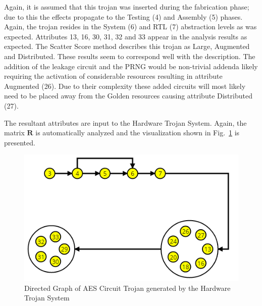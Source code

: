 \documentclass[journal, hidelinks]{IEEEtran}
\begin{document}
Again, it is assumed that this trojan was inserted during the fabrication phase; due to this the effects propagate to the Testing (4) and Assembly (5) phases.
Again, the trojan resides in the System (6) and RTL (7) abstraction levels as was expected.
Attributes 13, 16, 30, 31, 32 and 33 appear in the analysis results as expected.
The Scatter Score method describes this trojan as Large, Augmented and Distributed. 
These results seem to correspond well with the description. 
The addition of the leakage circuit and the PRNG would be non-trivial addenda likely requiring the activation of considerable resources resulting in attribute Augmented (26).
Due to their complexity these added circuits will most likely need to be placed away from the Golden resources causing attribute Distributed (27).

The resultant attributes are input to the Hardware Trojan System.
Again, the matrix $\mathbf{R}$ is automatically analyzed and the visualization shown in Fig.~\ref{fig:aesVisual} is presented.
\begin{figure}[h]
	\centering
	\includegraphics[width=0.91\linewidth]{Figures/aesVisual}
	\caption{Directed Graph of AES Circuit Trojan generated by the Hardware Trojan System}
	\label{fig:aesVisual}
\end{figure}

\end{document}

